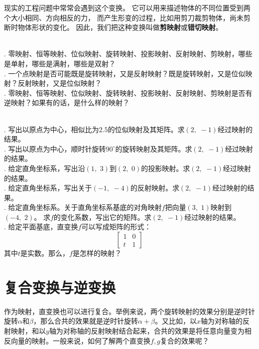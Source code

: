 \documentclass[12pt,UTF8]{ctexbook}
\begin{document}
现实的工程问题中常常会遇到这个变换。
它可以用来描述物体的不同位置受到两个大小相同、方向相反的力，
而产生形变的过程，比如用剪刀裁剪物体，尚未剪断时物体形状的变化。
因此，我们把这种变换叫做\textbf{剪映射}或\textbf{错切映射}。


\begin{sk}
    \mbox{} \\
    . 零映射、恒等映射、位似映射、旋转映射、投影映射、反射映射、剪映射，哪些是单射，哪些是满射，哪些是双射？\\
    . 一个点映射是否可能既是旋转映射，又是反射映射？既是旋转映射，又是位似映射？反射映射，又是位似映射？\\
    . 零映射、恒等映射、位似映射、旋转映射、投影映射、反射映射、剪映射是否有逆映射？如果有的话，是什么样的映射？
\end{sk}

\begin{xt}
    \mbox{} \\
    . 写出以原点为中心，相似比为$2.5$的位似映射及其矩阵。求$(2,\,\,-1)$经过映射的结果。\\
    . 写出以原点为中心，顺时针旋转$90^\circ$的旋转映射及其矩阵。求$(2,\,\,-1)$经过映射的结果。\\
    . 给定直角坐标系，写出沿$(1,\,\,3)$到$(2,\,\,0)$的投影映射。求$(2,\,\,-1)$经过映射的结果。\\
    . 给定直角坐标系，写出关于$(-1,\,\,-4)$的反射映射。求$(2,\,\,-1)$经过映射的结果。\\
    . 给定直角坐标系。关于直角坐标系基底的对角映射$f$把向量$(3,\,\,1)$映射到$(-4,\,\,2)$。
               求$f$的变化系数，写出它的矩阵。求$(2,\,\,-1)$经过映射的结果。\\
    . 给定平面基底，直变换$f$可以写成矩阵的形式：
                $$
                \begin{bmatrix}
                    1 & 0 \\ t & 1
                \end{bmatrix}
                $$
                其中$t$是实数。那么，$f$是怎样的映射？
\end{xt}

\section{复合变换与逆变换}
作为映射，直变换也可以进行复合。举例来说，两个旋转映射的效果分别是逆时针旋转$\alpha$和$\beta$，那么合共的效果就是逆时针旋转$\alpha+\beta$。又比如，以$x$轴为对称轴的反射映射，和以$y$轴为对称轴的反射映射结合起来，合共的效果是将任意向量变为相反向量的映射。一般来说，如何了解两个直变换$f,g$复合的效果呢？
\end{document}
